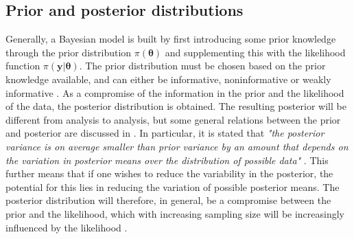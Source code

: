 \subsection{Prior and posterior distributions}
Generally, a Bayesian model is built by first introducing some prior knowledge through the prior distribution $\pi(\boldsymbol{\theta})$ and supplementing this with the likelihood function $\pi(\mathbf{y} \lvert \boldsymbol{\theta})$.
The prior distribution must be chosen based on the prior knowledge available, and can either be informative, noninformative or weakly informative \citep{gelman2015Bayesian}. 
As a compromise of the information in the prior and the likelihood of the data, the posterior distribution is obtained. 
The resulting posterior will be different from analysis to analysis, but some general relations between the prior and posterior are discussed in \citet{gelman2015Bayesian}.
In particular, it is stated that \textit{"the posterior variance is on average smaller than prior variance by an amount that depends on the variation in posterior means over the distribution of possible data"} \citep{gelman2015Bayesian}.
This further means that if one wishes to reduce the variability in the posterior, the potential for this lies in reducing the variation of possible posterior means.
The posterior distribution will therefore, in general, be a compromise between the prior and the likelihood, which with increasing sampling size will be increasingly influenced by the likelihood \citep{gelman2015Bayesian}.

